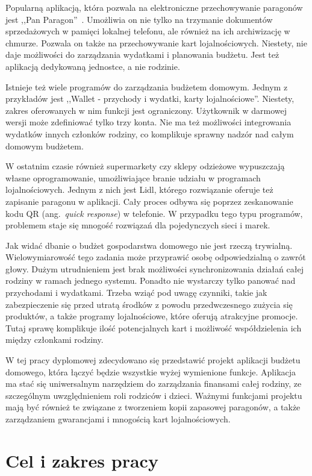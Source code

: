 Popularną aplikacją, która pozwala na elektroniczne przechowywanie paragonów jest ,,Pan Paragon''~\cite{pan-paragon}. Umożliwia on nie tylko na trzymanie dokumentów sprzedażowych w pamięci lokalnej telefonu, ale również na ich archiwizację w chmurze. Pozwala on także na przechowywanie kart lojalnościowych. Niestety, nie daje możliwości do zarządzania wydatkami i planowania budżetu. Jest też aplikacją dedykowaną jednostce, a nie rodzinie.

Istnieje też wiele programów do zarządzania budżetem domowym. Jednym z przykładów jest ,,Wallet - przychody i wydatki, karty lojalnościowe''\cite{wallet-wydatki}. Niestety, zakres oferowanych w nim funkcji jest ograniczony. Użytkownik w darmowej wersji może zdefiniować tylko trzy konta. Nie ma też możliwości integrowania wydatków innych członków rodziny, co komplikuje sprawny nadzór nad całym domowym budżetem.

W ostatnim czasie również supermarkety czy sklepy odzieżowe wypuszczają własne oprogramowanie, umożliwiające branie udziału w programach lojalnościowych. Jednym z nich jest Lidl, którego rozwiązanie oferuje też zapisanie paragonu w aplikacji. Cały proces odbywa się poprzez zeskanowanie kodu QR (ang.~\emph{quick response}) w telefonie. W przypadku tego typu programów, problemem staje się mnogość rozwiązań dla pojedynczych sieci i marek.

Jak widać dbanie o budżet gospodarstwa domowego nie jest rzeczą trywialną. Wielowymiarowość tego zadania może przyprawić osobę odpowiedzialną o zawrót głowy. Dużym utrudnieniem jest brak możliwości synchronizowania działań całej rodziny w ramach jednego systemu. Ponadto nie wystarczy tylko panować nad przychodami i wydatkami. Trzeba wziąć pod uwagę czynniki, takie jak zabezpieczenie się przed utratą środków z powodu przedwczesnego zużycia się produktów, a także  programy lojalnościowe, które oferują atrakcyjne promocje. Tutaj sprawę komplikuje ilość potencjalnych kart i możliwość współdzielenia ich między członkami rodziny. 

W tej pracy dyplomowej zdecydowano się przedstawić projekt aplikacji budżetu domowego, która łączyć będzie wszystkie wyżej wymienione funkcje. Aplikacja ma stać się uniwersalnym narzędziem do zarządzania finansami całej rodziny, ze szczególnym uwzględnieniem roli rodziców i dzieci. Ważnymi funkcjami projektu mają być również te związane z tworzeniem kopii zapasowej paragonów, a także zarządzaniem gwarancjami i mnogością kart lojalnościowych.

\section{Cel i zakres pracy}
\label{sec:cel-zakres}
